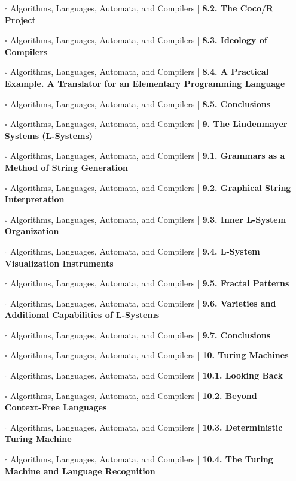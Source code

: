 \documentclass[a4, landscape, 12pt]{article}
\newcommand{\checkbox}{$\square$}%
\begin{document}
\begin{itemize}
{}
\item [\checkbox]  Algorithms, Languages, Automata, and Compilers | \textbf{ 8.2. The Coco/R Project
}
\item [\checkbox]  Algorithms, Languages, Automata, and Compilers | \textbf{ 8.3. Ideology of Compilers
}
\item [\checkbox]  Algorithms, Languages, Automata, and Compilers | \textbf{ 8.4. A Practical Example. A Translator for an Elementary Programming Language
}
\item [\checkbox]  Algorithms, Languages, Automata, and Compilers | \textbf{ 8.5. Conclusions
}
\item [\checkbox]  Algorithms, Languages, Automata, and Compilers | \textbf{ 9. The Lindenmayer Systems (L-Systems)
}
\item [\checkbox]  Algorithms, Languages, Automata, and Compilers | \textbf{ 9.1. Grammars as a Method of String Generation
}
\item [\checkbox]  Algorithms, Languages, Automata, and Compilers | \textbf{ 9.2. Graphical String Interpretation
}
\item [\checkbox]  Algorithms, Languages, Automata, and Compilers | \textbf{ 9.3. Inner L-System Organization
}
\item [\checkbox]  Algorithms, Languages, Automata, and Compilers | \textbf{ 9.4. L-System Visualization Instruments
}
\item [\checkbox]  Algorithms, Languages, Automata, and Compilers | \textbf{ 9.5. Fractal Patterns
}
\item [\checkbox]  Algorithms, Languages, Automata, and Compilers | \textbf{ 9.6. Varieties and Additional Capabilities of L-Systems
}
\item [\checkbox]  Algorithms, Languages, Automata, and Compilers | \textbf{ 9.7. Conclusions
}
\item [\checkbox]  Algorithms, Languages, Automata, and Compilers | \textbf{ 10. Turing Machines
}
\item [\checkbox]  Algorithms, Languages, Automata, and Compilers | \textbf{ 10.1. Looking Back
}
\item [\checkbox]  Algorithms, Languages, Automata, and Compilers | \textbf{ 10.2. Beyond Context-Free Languages
}
\item [\checkbox]  Algorithms, Languages, Automata, and Compilers | \textbf{ 10.3. Deterministic Turing Machine
}
\item [\checkbox]  Algorithms, Languages, Automata, and Compilers | \textbf{ 10.4. The Turing Machine and Language Recognition
}
\end{itemize}
\end{document}
